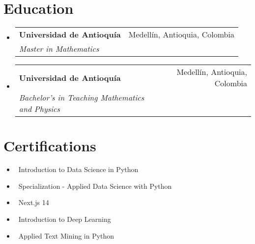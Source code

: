 \documentclass[letterpaper,10pt]{article}
\makeatletter
\newcommand{\resumeItem}[1]{\item\small{#1}}
\newcommand{\resumeSubheading}[4]{
\vspace{-1pt}\item
  \begin{tabular*}{0.97\textwidth}[t]{l@{\extracolsep{\fill}}r}
    \textbf{#1} & #2 \\
    \textit{#3} & \textit{#4} \\
  \end{tabular*}\vspace{-7pt}
}
\newcommand{\resumeSubHeadingList}{\begin{itemize}[leftmargin=0.15in, label={}]}
\newcommand{\resumeSubHeadingListEnd}{\end{itemize}}
\makeatother
\begin{document}
\section{Education}
\resumeSubHeadingList
  \resumeSubheading
      {Universidad de Antioquía}{Medellín, Antioquia, Colombia}
      {Master in Mathematics}{}
  \resumeSubheading
      {Universidad de Antioquía}{Medellín, Antioquia, Colombia}
      {Bachelor's in Teaching Mathematics and Physics}{}
\resumeSubHeadingListEnd

\section{Certifications}
\resumeSubHeadingList
  \resumeItem{\textbullet\ Introduction to Data Science in Python}
  \resumeItem{\textbullet\ Specialization - Applied Data Science with Python}
  \resumeItem{\textbullet\ Next.js 14}
  \resumeItem{\textbullet\ Introduction to Deep Learning}
  \resumeItem{\textbullet\ Applied Text Mining in Python}
\resumeSubHeadingListEnd
\end{document}
